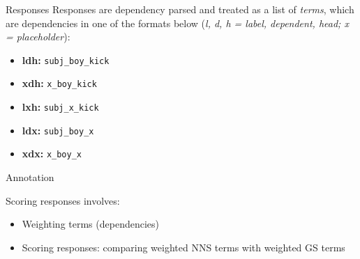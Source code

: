 \documentclass[final,t]{beamer}
\begin{document}
\begin{frame}{}
\begin{columns}[t]
\begin{column}{.64\linewidth}
\begin{columns}
\begin{column}{.48\linewidth}
\begin{block}{Responses}
Responses are dependency parsed and treated as a list of \textit{terms}, which are dependencies in one of the formats below (\textit{l, d, h = label, dependent, head; x = placeholder}):
\begin{center}

\begin{minipage}{.33\textwidth}
  \begin{mdframed}[innertopmargin=15pt,innerbottommargin=15pt,roundcorner=10pt]
  \begin{center}
  \begin{minipage}{.8\textwidth}
    \begin{itemize}
    \item{\textbf{ldh:} \texttt{subj\_boy\_kick}}
    \item{\textbf{xdh:} \texttt{x\_boy\_kick}}
    \item{\textbf{lxh:} \texttt{subj\_x\_kick}}
    \item{\textbf{ldx:} \texttt{subj\_boy\_x}}
    \item{\textbf{xdx:} \texttt{x\_boy\_x}}
    \end{itemize}
  \end{minipage}
  \end{center}
  \end{mdframed}
\end{minipage}
\end{center}

\vspace{-.5em}
\end{block} 

\begin{block}{Annotation}

Scoring responses involves: 
\begin{center}
  \begin{minipage}{.85\textwidth}
    \begin{itemize}
    \item Weighting terms (dependencies) 
    \item Scoring responses: comparing weighted NNS terms with
      weighted GS terms
    \end{itemize}
  \end{minipage}
\end{center}


\end{block}
\end{column}
\end{columns}
\end{column}
\end{columns}
\end{frame}
\end{document}
